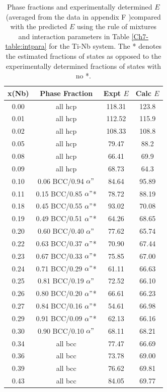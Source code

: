 \newpage
\begin{table}[H]
	\caption{Phase fractions and experimentally determined $E$ (averaged from the data in appendix F \cite{Friak2012,Timoshevskii2011,Friak2012,Karre2015})compared with the predicted $E$ using the rule of mixtures and interaction parameters in Table \ref{Ch7-table:intpara} for the Ti-Nb system. The * denotes the estimated fractions of states as opposed to the experimentally determined fractions of states with no *.}
	\centering
	\begin{tabular}{ c c c c}
		\hline
		x(Nb) & Phase Fraction & Expt $E$ & Calc $E$\\
		\hline
		0.00 & all hcp & 118.31 & 123.8\\
		0.01 & all hcp & 112.52 & 115.9\\
		0.02 & all hcp & 108.33 & 108.8\\
		0.05 & all hcp & 79.47 & 88.2\\
		0.08 & all hcp & 66.41 & 69.9\\
		0.09 & all hcp & 68.73 & 64.3\\
		0.10 & 0.06 BCC/0.94 $\alpha"$ & 84.64 & 95.89\\
		0.11 & 0.15 BCC/0.85 $\alpha"$* & 78.72 & 88.19\\
		0.18 & 0.45 BCC/0.55 $\alpha"$* & 93.02 & 70.08\\
		0.19 & 0.49 BCC/0.51 $\alpha"$* & 64.26 & 68.65\\
		0.20 & 0.60 BCC/0.40 $\alpha"$ & 77.62 & 65.74\\
		0.22 & 0.63 BCC/0.37 $\alpha"$* & 70.90 & 67.44\\
		0.23 & 0.67 BCC/0.33 $\alpha"$* & 75.85 & 67.00\\
		0.24 & 0.71 BCC/0.29 $\alpha"$* & 61.11 & 66.63\\
		0.25 & 0.81 BCC/0.19 $\alpha"$ & 72.52 & 66.10\\
		0.26 & 0.80 BCC/0.20 $\alpha"$* & 66.61 & 66.23\\
		0.27 & 0.84 BCC/0.16 $\alpha"$* & 54.61 & 66.98\\
		0.29 & 0.91 BCC/0.09 $\alpha"$* & 62.13 & 66.16\\
		0.30 & 0.90 BCC/0.10 $\alpha"$ & 68.11 & 68.21\\
		0.34 & all bcc & 77.47 & 66.69\\
		0.36 & all bcc & 73.78 & 69.00\\
		0.39 & all bcc & 76.62 & 69.81\\
		0.43 & all bcc & 84.05 & 69.77\\
		\hline
	\end{tabular}
	\label{Ch7-table:elasexptdata}
\end{table}
\clearpage

